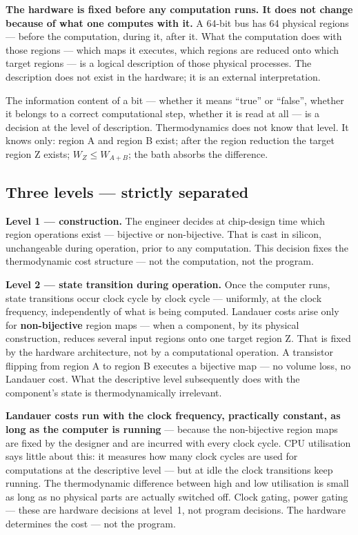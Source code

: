 \textbf{The hardware is fixed before any computation runs. It does not change
because of what one computes with it.} A 64-bit bus has 64 physical regions ---
before the computation, during it, after it. What the computation does with those
regions --- which maps it executes, which regions are reduced onto which target
regions --- is a logical description of those physical processes. The description
does not exist in the hardware; it is an external interpretation.

The information content of a bit --- whether it means “true” or “false”, whether
it belongs to a correct computational step, whether it is read at all --- is a
decision at the level of description. Thermodynamics does not know that level. It
knows only: region A and region B exist; after the region reduction the target
region Z exists; $W_Z \le W_{A+B}$; the bath absorbs the difference.

\subsection{Three levels --- strictly separated}

\LB \textbf{Level 1 --- construction.} The engineer decides at chip-design time
which region operations exist --- bijective or non-bijective. That is cast in
silicon, unchangeable during operation, prior to any computation. This decision
fixes the thermodynamic cost structure --- not the computation, not the program.

\LB \textbf{Level 2 --- state transition during operation.} Once the computer
runs, state transitions occur clock cycle by clock cycle --- uniformly, at the
clock frequency, independently of what is being computed. Landauer costs arise
only for \textbf{non-bijective} region maps --- when a component, by its physical
construction, reduces several input regions onto one target region Z. That is
fixed by the hardware architecture, not by a computational operation. A transistor
flipping from region A to region B executes a bijective map --- no volume loss, no
Landauer cost. What the descriptive level subsequently does with the component's
state is thermodynamically irrelevant.

\textbf{Landauer costs run with the clock frequency, practically constant, as long
as the computer is running} --- because the non-bijective region maps are fixed by
the designer and are incurred with every clock cycle. CPU utilisation says little
about this: it measures how many clock cycles are used for computations at the
descriptive level --- but at idle the clock transitions keep running. The
thermodynamic difference between high and low utilisation is small as long as no
physical parts are actually switched off. Clock gating, power gating --- these are
hardware decisions at level~1, not program decisions. The hardware determines the
cost --- not the program.

